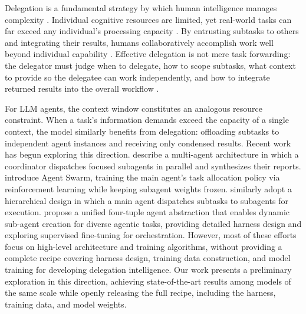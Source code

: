 \documentclass{llmxive}
\begin{document}
Delegation is a fundamental strategy by which human intelligence manages complexity \citep{simon2013administrative}. Individual cognitive resources are limited, yet real-world tasks can far exceed any individual's processing capacity \citep{kahneman1973attention}. By entrusting subtasks to others and integrating their results, humans collaboratively accomplish work well beyond individual capability \citep{march1993organizations}. Effective delegation is not mere task forwarding: the delegator must judge when to delegate, how to scope subtasks, what context to provide so the delegatee can work independently, and how to integrate returned results into the overall workflow \citep{castelfranchi1998towards}.

For LLM agents, the context window constitutes an analogous resource constraint. When a task's information demands exceed the capacity of a single context, the model similarly benefits from delegation: offloading subtasks to independent agent instances and receiving only condensed results. Recent work has begun exploring this direction. \citet{anthropic2025multiagent} describe a multi-agent architecture in which a coordinator dispatches focused subagents in parallel and synthesizes their reports. \citet{team2026kimi} introduce Agent Swarm, training the main agent's task allocation policy via reinforcement learning while keeping subagent weights frozen. \citet{huang2026step} similarly adopt a hierarchical design in which a main agent dispatches subtasks to subagents for execution. \citet{ruan2026aorchestra} propose a unified four-tuple agent abstraction that enables dynamic sub-agent creation for diverse agentic tasks, providing detailed harness design and exploring supervised fine-tuning for orchestration. However, most of these efforts focus on high-level architecture and training algorithms, without providing a complete recipe covering harness design, training data construction, and model training for developing delegation intelligence. Our work presents a preliminary exploration in this direction, achieving state-of-the-art results among models of the same scale while openly releasing the full recipe, including the harness, training data, and model weights.
\end{document}
